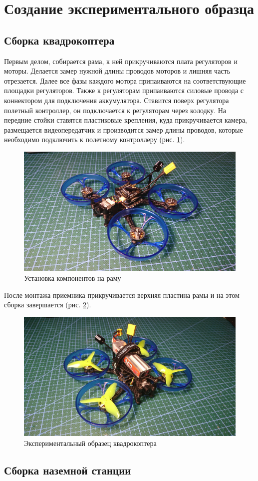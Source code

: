 
\section{Создание экспериментального образца}

\subsection{Сборка квадрокоптера}
Первым делом, собирается рама, к ней прикручиваются плата регуляторов и моторы. Делается замер нужной длины проводов моторов и лишняя часть отрезается. Далее все фазы каждого мотора припаиваются на соответствующие площадки регуляторов. Также к регуляторам припаиваются силовые провода с коннектором для подключения аккумулятора. Ставится поверх регулятора полетный контроллер, он подключается к регуляторам через колодку. На передние стойки ставятся пластиковые крепления, куда прикручивается камера, размещается видеопередатчик и производится замер длины проводов, которые необходимо подключить к полетному контроллеру (рис. \ref{fig:quad1}).
\begin{figure}[H]
	\centering
	\includegraphics[width=0.5\linewidth]{pics/quad1}
	\caption{Установка компонентов на раму
	}
	\label{fig:quad1}
\end{figure}
После монтажа приемника прикручивается верхняя пластина рамы и на этом сборка завершается (рис. \ref{fig:quad2}).
\begin{figure}[H]
	\centering
	\includegraphics[width=0.5\linewidth]{pics/quad2}
	\caption{Экспериментальный образец квадрокоптера
	}
	\label{fig:quad2}
\end{figure}

\subsection{Сборка наземной станции}

